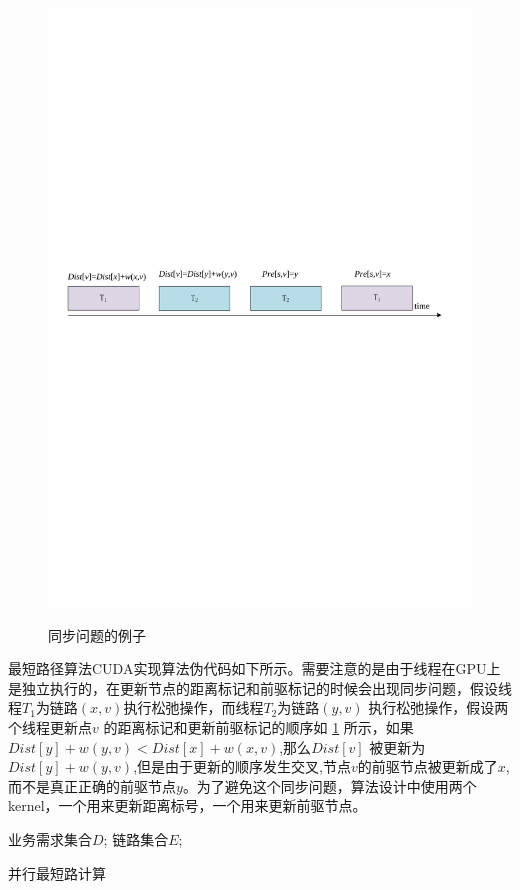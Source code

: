 \begin{figure}
\setlength{\belowcaptionskip}{-0.1cm}
  \begin{center}
    {\includegraphics[width=0.8 \textwidth]{figures/SynPro.pdf}}
    \end{center}
  \caption{{\footnotesize{同步问题的例子}}}
  \label{SynPro}
\end{figure}
最短路径算法CUDA实现算法伪代码如下所示。需要注意的是由于线程在GPU上是独立执行的，在更新节点的距离标记和前驱标记的时候会出现同步问题，假设线程$T_1$为链路$(x,v)$执行松弛操作，而线程$T_2$为链路$(y,v)$ 执行松弛操作，假设两个线程更新点$v$ 的距离标记和更新前驱标记的顺序如 \ref{SynPro} 所示，如果$Dist[y] + w(y, v) < Dist[x] +w(x, v)$,那么$Dist[v]$ 被更新为$Dist[y] + w(y, v)$,但是由于更新的顺序发生交叉,节点$v$的前驱节点被更新成了$x$, 而不是真正正确的前驱节点$y$。为了避免这个同步问题，算法设计中使用两个kernel，一个用来更新距离标号，一个用来更新前驱节点。
\begin{algorithm}[t]
\begin{algorithmic}[1]
\Require
	 业务需求集合$D$;
      链路集合$E$;
\EndWhile
\end{algorithmic}
\caption{{并行最短路计算}}
\label{ParaSPC}
\end{algorithm}

